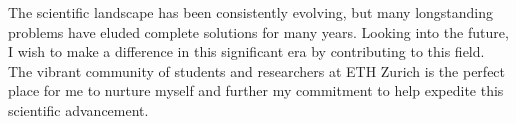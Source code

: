 \documentclass{article}
\begin{document}
\hspace{0.25in}The scientific landscape has been consistently evolving, but many longstanding
problems have eluded complete solutions for many years. Looking into the future,
I wish to make a difference in this significant era by contributing to this
field. The vibrant community of students and researchers at ETH Zurich is the
perfect place for me to nurture myself and further my commitment to help
expedite this scientific advancement. 
\end{document}
